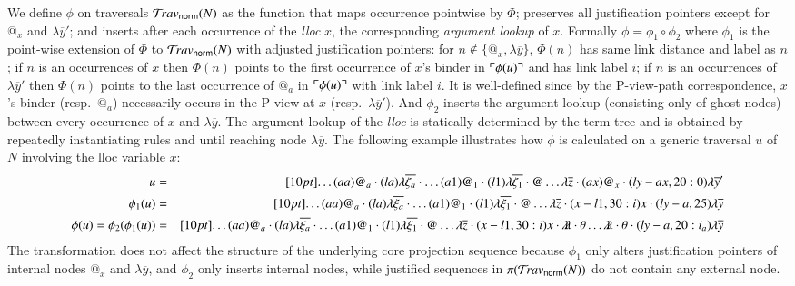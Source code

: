 \documentclass{elsarticle}
\theoremstyle{plain}
\theoremstyle{definition}
\newcommand{\ghostlmd}{{\lambda\!\!\lambda}}
\newcommand{\ghostvar}{\theta}
\newcommand{\normalizing}{{\sf norm}}
\newcommand{\travsetnorm}{\travset_\normalizing} %
\def\coresymbol{\pi} %
\newcommand\bulklambda[1]{{\lambda\overline{#1}}}
\begin{document}
We define $\phi$ on traversals $\travsetnorm(N)$
as the function that maps occurrence pointwise by $\Phi$;
preserves all justification pointers except
for $@_x$ and $\lambda\overline{y}'$;
and inserts after each occurrence of the \emph{lloc} $x$, the corresponding \emph{argument lookup} of $x$.
Formally $\phi = \phi_1 \circ \phi_2$ where
%
$\phi_1$ is the point-wise extension of $\Phi$ to $\travsetnorm(N)$
with adjusted justification pointers:
for $n\not\in \{ @_x, \lambda\overline{y} \}$, $\Phi(n)$ has same link distance and label as $n$;
if $n$ is an occurrences of $x$ then $\Phi(n)$ points to the first occurrence of $x$'s binder in $\ulcorner \phi(u) \urcorner$ and has link label $i$;
if $n$ is an occurrences of $\lambda\overline{y}'$ then  $\Phi(n)$ points to the last occurrence of $@_a$ in $\ulcorner \phi(u) \urcorner$ with link label $i$.
It is well-defined since by the P-view-path correspondence, $x$'s binder (resp.~$@_a$) necessarily occurs in the P-view at $x$ (resp.~$\lambda\overline{y}'$).
%
And $\phi_2$ inserts the argument lookup (consisting only of ghost
nodes) between every occurrence of $x$ and $\lambda\overline{y}$. The argument lookup of the \emph{lloc} is statically determined by the
term tree and is obtained by repeatedly instantiating rules  and  until reaching node $\lambda\overline{y}$.
%
The following example illustrates how $\phi$ is calculated on a generic
traversal $u$ of $N$ involving the lloc variable $x$:
\begin{eqnarray*}
    u &=& \Pstr[10pt]{ \ldots (aa){@_a} \cdot (la){\bulklambda{\xi_a}} \cdot \ldots (a1){@_1} \cdot (l1){\bulklambda{\xi_1}} \cdot @ \ldots \bulklambda{z} \cdot (ax){@_x} \cdot (ly-ax,20:0){\bulklambda{y}'} }
    \\
    \phi_1(u) &=& \Pstr[10pt]{ \ldots (aa){@_a} \cdot (la){\bulklambda{\xi_a}} \cdot \ldots (a1){@_1} \cdot (l1){\bulklambda{\xi_1}} \cdot @ \ldots \bulklambda{z} \cdot (x-l1,30:i) x \cdot (ly-a,25){\bulklambda{y}} }
    \\
    \phi(u) = \phi_2(\phi_1(u)) &=& \Pstr[10pt]{ \ldots (aa){@_a} \cdot (la){\bulklambda{\xi_a}} \cdot \ldots (a1){@_1} \cdot (l1){\bulklambda{\xi_1}} \cdot @ \ldots \bulklambda{z} \cdot (x-l1,30:i) x \cdot \ghostlmd \cdot \ghostvar \ldots \ghostlmd \cdot \ghostvar \cdot (ly-a,20:i_a){\bulklambda{y}} }
\end{eqnarray*}
The transformation does not affect the structure
of the underlying core projection sequence
because $\phi_1$ only alters justification pointers of internal nodes $@_x$ and $\lambda\overline y$, and $\phi_2$ only inserts internal nodes, while justified sequences in $\coresymbol(\travsetnorm(N))$ do not contain any external node.
\end{document}
